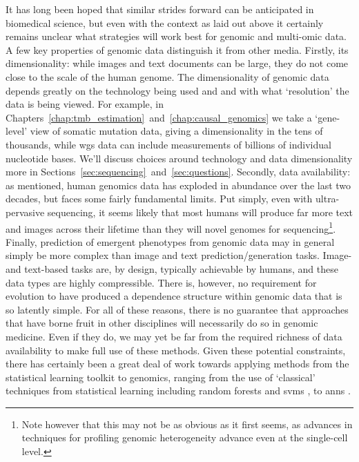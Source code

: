 \documentclass[thesis.tex]{subfiles}
\begin{document}
It has long been hoped that similar strides forward can be anticipated in biomedical science, but even with the context as laid out above it certainly remains unclear what strategies will work best for genomic and multi-omic data. A few key properties of genomic data distinguish it from other media. Firstly, its dimensionality: while images and text documents can be large, they do not come close to the scale of the human genome. The dimensionality of genomic data depends greatly on the technology being used and and with what `resolution' the data is being viewed. For example, in Chapters~\ref{chap:tmb_estimation}~and~\ref{chap:causal_genomics} we take a `gene-level' view of somatic mutation data, giving a dimensionality in the tens of thousands, while \gls{wgs} data can include measurements of billions of individual nucleotide bases. We'll discuss choices around technology and data dimensionality more in Sections~\ref{sec:sequencing}~and~\ref{sec:questions}. Secondly, data availability: as mentioned, human genomics data has exploded in abundance over the last two decades, but faces some fairly fundamental limits. Put simply, even with ultra-pervasive sequencing, it seems likely that most humans will produce far more text and images across their lifetime than they will novel genomes for sequencing\footnote{Note however that this may not be as obvious as it first seems, as advances in techniques for profiling genomic heterogeneity advance even at the single-cell level.}. Finally, prediction of emergent phenotypes from genomic data may in general simply be more complex than image and text prediction/generation tasks. Image- and text-based tasks are, by design, typically achievable by humans, and these data types are highly compressible. There is, however, no requirement for evolution to have produced a dependence structure within genomic data that is so latently simple. For all of these reasons, there is no guarantee that approaches that have borne fruit in other disciplines will necessarily do so in genomic medicine. Even if they do, we may yet be far from the required richness of data availability to make full use of these methods.
Given these potential constraints, there has certainly been a great deal of work towards applying methods from the statistical learning toolkit to genomics, ranging from the use of `classical' techniques from statistical learning including random forests \citep{breiman_random_2001, chen_random_2012} and \glspl{svm} \citep{cortes_support-vector_1995, huang_applications_2018}, to \glspl{ann} \citep{avsec_effective_2021, tran_deep_2021}. 
 
\end{document}
